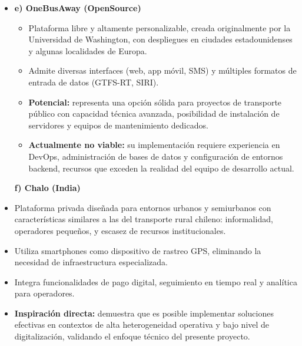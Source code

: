 \documentclass[12pt]{article}
\begin{document}
\begin{itemize}
\begin{itemize}
        \item \textbf{Limitación:} su modelo de crowdsourcing no es viable en comunidades con baja densidad poblacional o escaso acceso digital. 

        \item \textbf{Ventaja del proyecto:} el sistema parte de la base de que el chofer es el nodo emisor de datos, lo que garantiza cobertura y precisión sin depender de usuarios externos ni condiciones de adopción masiva. 
    \end{itemize}
    \item \textbf{e) OneBusAway (OpenSource)}
    \begin{itemize}
        \item Plataforma libre y altamente personalizable, creada originalmente por la Universidad de Washington, con despliegues en ciudades estadounidenses y algunas localidades de Europa. 

        \item Admite diversas interfaces (web, app móvil, SMS) y múltiples formatos de entrada de datos (GTFS-RT, SIRI). 

        \item \textbf{Potencial:} representa una opción sólida para proyectos de transporte público con capacidad técnica avanzada, posibilidad de instalación de servidores y equipos de mantenimiento dedicados. 

        \item \textbf{Actualmente no viable:} su implementación requiere experiencia en DevOps, administración de bases de datos y configuración de entornos backend, recursos que exceden la realidad del equipo de desarrollo actual. 
    \end{itemize}
    \newpage
    \textbf{f) Chalo (India)}
        \item Plataforma privada diseñada para entornos urbanos y semiurbanos con características similares a las del transporte rural chileno: informalidad, operadores pequeños, y escasez de recursos institucionales. 

        \item Utiliza smartphones como dispositivo de rastreo GPS, eliminando la necesidad de infraestructura especializada. 

        \item Integra funcionalidades de pago digital, seguimiento en tiempo real y analítica para operadores. 

        \item \textbf{Inspiración directa:} demuestra que es posible implementar soluciones efectivas en contextos de alta heterogeneidad operativa y bajo nivel de digitalización, validando el enfoque técnico del presente proyecto. 
\end{itemize}\\
\end{document}

